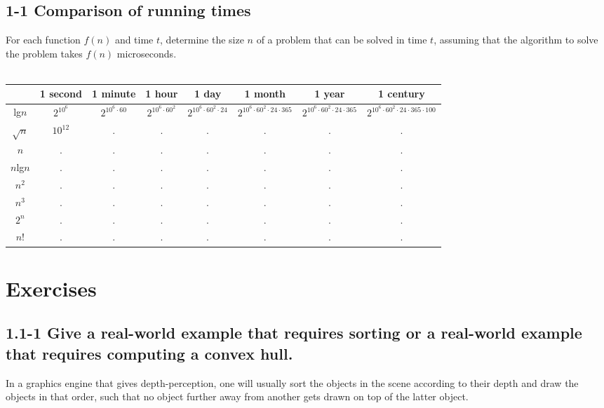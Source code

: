 \documentclass[11pt,english]{article}
\begin{document}
\subsection*{1-1 Comparison of running times}
For each function $f(n)$ and time $t$, determine the size $n$ of a problem
that can be solved in time $t$, assuming that the algorithm to solve the
problem takes $f(n)$ microseconds.
\\\\
\small
\begin{tabular}[]{|c|c|c|c|c|c|c|c|}
	\hline
	{\ } & 1 second & 1 minute & 1 hour & 1 day & 1 month & 1 year & 1 century\\
	\hline
	
	lg$n$ & $2^{10^6}$ & $2^{10^6 \cdot 60}$ & $2^{10^6 \cdot 60^2}$ &
	$2^{10^6 \cdot 60^2 \cdot 24}$ & $2^{10^6 \cdot 60^2 \cdot 24 \cdot 365}$ &
	$2^{10^6 \cdot 60^2 \cdot 24 \cdot 365}$ &
	$2^{10^6 \cdot 60^2 \cdot 24 \cdot 365 \cdot 100}$\\	
	
	$\sqrt{n}$ & $10^{12}$ & . & . & . & . & . & .\\
	
	$n$ & . & . & . & . & . & . & .\\ 
	
	$n$lg$n$ & . & . & . & . & . & . & .\\ 
	
	$n^2$ & . & . & . & . & . & . & .\\ 
	
	$n^3$ & . & . & . & . & . & . & .\\ 
	
	$2^n$ & . & . & . & . & . & . & .\\ 
	
	$n$! & . & . & . & . & . & . & .\\ 
	
	\hline
\end{tabular}


\newpage
\pagestyle{fancy}

\section*{Exercises}

\subsection*{1.1-1 \mdseries Give a real-world example that requires sorting
or a real-world example that requires computing a convex hull.}
In a graphics engine that gives depth-perception, one will usually sort the
objects in the scene according to their depth and draw the objects in that
order, such that no object further away from another gets drawn on top of the
latter object.
\end{document}

